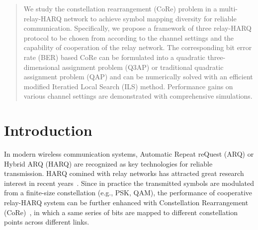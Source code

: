 \documentclass[conference]{IEEEtran}
\begin{document}



\maketitle


\begin{abstract}
    We study the constellation rearrangement (CoRe) problem in a
    multi-relay-HARQ network to achieve symbol mapping diversity for reliable
    communication.
    Specifically, we propose a framework of three relay-HARQ protocol
    to be chosen from according to the channel settings and the
    capability of cooperation of the relay network. The corresponding bit
    error rate (BER) based CoRe can be formulated into a quadratic
    three-dimensional assignment problem (Q3AP) or traditional quadratic
    assignment problem (QAP) and can be numerically solved with an efficient
    modified Iteratied Local Search (ILS) method.
    Performance gains on various channel settings are demonstrated with
    comprehensive simulations.
\end{abstract}





%
\IEEEpeerreviewmaketitle



\section{Introduction}
In modern wireless communication systems, Automatic Repeat reQuest (ARQ) or
Hybrid ARQ (HARQ) are recognized as key technologies for reliable transmission.
HARQ comined with relay networks has attracted great research interest in recent
years~\cite{ngo2014hybrid}. Since in practice the transmitted symbols are modulated
from a finite-size constellation (e.g., PSK, QAM), the performance of cooperative
relay-HARQ system can be further enhanced with Constellation Rearrangement
(CoRe)~\cite{benelli1992new, wengerter2002advanced}, in which a same series of
bits are mapped to different constellation points across different links.
\end{document}
